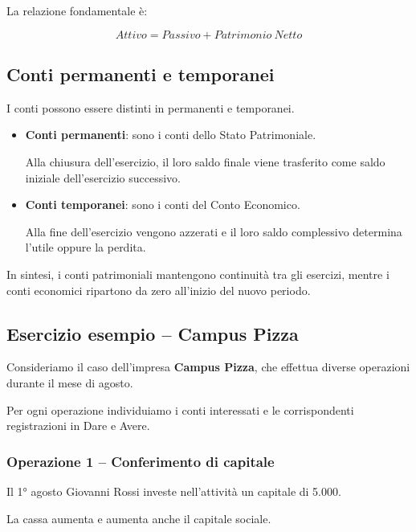 \noindent La relazione fondamentale è:

\[
\boxed{
Attivo=Passivo+Patrimonio\ Netto
}
\]


\subsection{Conti permanenti e temporanei}

\noindent I conti possono essere distinti
in permanenti e temporanei.

\begin{itemize}
    \item \textbf{Conti permanenti}: sono i conti
    dello Stato Patrimoniale.

    \noindent Alla chiusura dell'esercizio,
    il loro saldo finale viene trasferito
    come saldo iniziale dell'esercizio successivo.

    \item \textbf{Conti temporanei}: sono i conti
    del Conto Economico.

    \noindent Alla fine dell'esercizio vengono
    azzerati e il loro saldo complessivo
    determina l'utile oppure la perdita.
\end{itemize}

\noindent In sintesi, i conti patrimoniali
mantengono continuità tra gli esercizi,
mentre i conti economici ripartono
da zero all'inizio del nuovo periodo.


\subsection{Esercizio esempio -- Campus Pizza}

\noindent Consideriamo il caso dell'impresa
\textbf{Campus Pizza}, che effettua diverse
operazioni durante il mese di agosto.

\medskip

\noindent Per ogni operazione individuiamo
i conti interessati e le corrispondenti
registrazioni in Dare e Avere.


\subsubsection*{Operazione 1 -- Conferimento di capitale}

\noindent Il 1° agosto Giovanni Rossi
investe nell'attività un capitale di 5.000.

\medskip

\noindent La cassa aumenta e aumenta
anche il capitale sociale.

